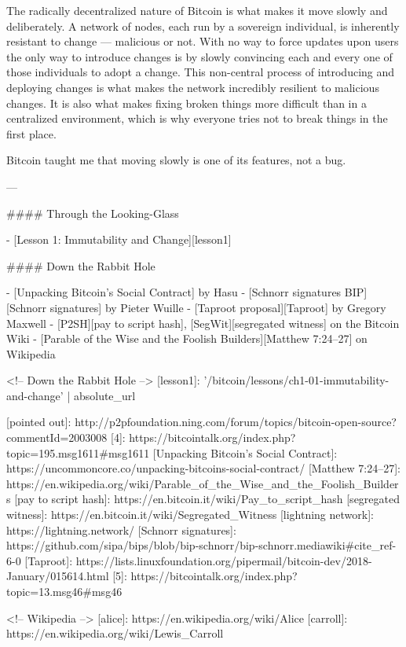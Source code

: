 The radically decentralized nature of Bitcoin is what makes it move
slowly and deliberately. A network of nodes, each run by a sovereign
individual, is inherently resistant to change --- malicious or not. With
no way to force updates upon users the only way to introduce changes is
by slowly convincing each and every one of those individuals to adopt a
change. This non-central process of introducing and deploying changes is
what makes the network incredibly resilient to malicious changes. It is
also what makes fixing broken things more difficult than in a
centralized environment, which is why everyone tries not to break things
in the first place.

Bitcoin taught me that moving slowly is one of its features, not a bug.

---

#### Through the Looking-Glass

- [Lesson 1: Immutability and Change][lesson1]

#### Down the Rabbit Hole

- [Unpacking Bitcoin's Social Contract] by Hasu
- [Schnorr signatures BIP][Schnorr signatures] by Pieter Wuille
- [Taproot proposal][Taproot] by Gregory Maxwell
- [P2SH][pay to script hash], [SegWit][segregated witness] on the Bitcoin Wiki
- [Parable of the Wise and the Foolish Builders][Matthew 7:24--27] on Wikipedia

<!-- Down the Rabbit Hole -->
[lesson1]: {{ '/bitcoin/lessons/ch1-01-immutability-and-change' | absolute_url }}

[pointed out]: http://p2pfoundation.ning.com/forum/topics/bitcoin-open-source?commentId=2003008%
[4]: https://bitcointalk.org/index.php?topic=195.msg1611#msg1611
[Unpacking Bitcoin's Social Contract]: https://uncommoncore.co/unpacking-bitcoins-social-contract/
[Matthew 7:24--27]: https://en.wikipedia.org/wiki/Parable_of_the_Wise_and_the_Foolish_Builders
[pay to script hash]: https://en.bitcoin.it/wiki/Pay_to_script_hash
[segregated witness]: https://en.bitcoin.it/wiki/Segregated_Witness
[lightning network]: https://lightning.network/
[Schnorr signatures]: https://github.com/sipa/bips/blob/bip-schnorr/bip-schnorr.mediawiki#cite_ref-6-0
[Taproot]: https://lists.linuxfoundation.org/pipermail/bitcoin-dev/2018-January/015614.html
[5]: https://bitcointalk.org/index.php?topic=13.msg46#msg46

<!-- Wikipedia -->
[alice]: https://en.wikipedia.org/wiki/Alice%
[carroll]: https://en.wikipedia.org/wiki/Lewis_Carroll
